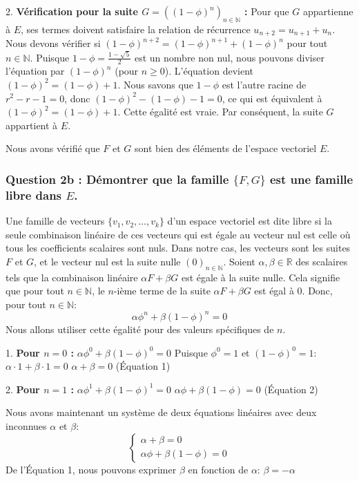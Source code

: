 \documentclass{report}
\begin{document}
2.  \textbf{Vérification pour la suite $G = ((1-\phi)^n)_{n \in \mathbb{N}}$ :}
    Pour que $G$ appartienne à $E$, ses termes doivent satisfaire la relation de récurrence $u_{n+2} = u_{n+1} + u_n$.
    Nous devons vérifier si $(1-\phi)^{n+2} = (1-\phi)^{n+1} + (1-\phi)^n$ pour tout $n \in \mathbb{N}$.
    Puisque $1-\phi = \frac{1-\sqrt{5}}{2}$ est un nombre non nul, nous pouvons diviser l'équation par $(1-\phi)^n$ (pour $n \ge 0$).
    L'équation devient $(1-\phi)^2 = (1-\phi) + 1$.
    Nous savons que $1-\phi$ est l'autre racine de $r^2 - r - 1 = 0$, donc $(1-\phi)^2 - (1-\phi) - 1 = 0$, ce qui est équivalent à $(1-\phi)^2 = (1-\phi) + 1$.
    Cette égalité est vraie. Par conséquent, la suite $G$ appartient à $E$.

Nous avons vérifié que $F$ et $G$ sont bien des éléments de l'espace vectoriel $E$.

\subsubsection*{Question 2b : Démontrer que la famille $\{F, G\}$ est une famille libre dans $E$.}

Une famille de vecteurs $\{v_1, v_2, \dots, v_k\}$ d'un espace vectoriel est dite libre si la seule combinaison linéaire de ces vecteurs qui est égale au vecteur nul est celle où tous les coefficients scalaires sont nuls.
Dans notre cas, les vecteurs sont les suites $F$ et $G$, et le vecteur nul est la suite nulle $(0)_{n \in \mathbb{N}}$.
Soient $\alpha, \beta \in \mathbb{R}$ des scalaires tels que la combinaison linéaire $\alpha F + \beta G$ est égale à la suite nulle.
Cela signifie que pour tout $n \in \mathbb{N}$, le $n$-ième terme de la suite $\alpha F + \beta G$ est égal à 0.
Donc, pour tout $n \in \mathbb{N}$:
$$\alpha \phi^n + \beta (1-\phi)^n = 0$$
Nous allons utiliser cette égalité pour des valeurs spécifiques de $n$.

1.  \textbf{Pour $n=0$ :}
    $\alpha \phi^0 + \beta (1-\phi)^0 = 0$
    Puisque $\phi^0 = 1$ et $(1-\phi)^0 = 1$:
    $\alpha \cdot 1 + \beta \cdot 1 = 0$
    $\alpha + \beta = 0$ (Équation 1)

2.  \textbf{Pour $n=1$ :}
    $\alpha \phi^1 + \beta (1-\phi)^1 = 0$
    $\alpha \phi + \beta (1-\phi) = 0$ (Équation 2)

Nous avons maintenant un système de deux équations linéaires avec deux inconnues $\alpha$ et $\beta$:
$$ \begin{cases} \alpha + \beta = 0 \\ \alpha \phi + \beta (1-\phi) = 0 \end{cases} $$
De l'Équation 1, nous pouvons exprimer $\beta$ en fonction de $\alpha$:
$\beta = -\alpha$
\end{document}
